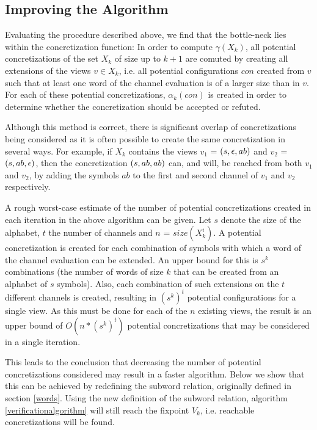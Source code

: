 \subsection{Improving the Algorithm}
Evaluating the procedure described above, we find that the bottle-neck lies within the concretization function:
 In order to compute $\gamma(X_k)$, all potential concretizations of the set $X_k$ of size up to $k+1$ are comuted by creating all extensions of the views $v \in X_k$, i.e. all potential configurations $con$ created from $v$ such that at least one word of the channel evaluation is of a larger size than in $v$. For each of these potential concretizations, $\alpha_k(con)$ is created in order to determine whether the concretization should be accepted or refuted.

Although this method is correct, there is significant overlap of concretizations being considered as it is often possible to create the same concretization  in several ways. For example, if $X_k$ contains the views $v_1$ = $(s, \epsilon, ab)$ and $v_2$ = $(s, ab, \epsilon)$, then the concretization $(s, ab,ab)$ can, and will, be reached from both $v_1$ and $v_2$, by adding the symbols $ab$ to the first and second channel of $v_1$ and $v_2$ respectively.

A rough worst-case estimate of the number of potential concretizations created in each iteration in the above algorithm can be given. Let $s$ denote the size of the alphabet, $t$ the number of channels and $n$ = $size(X_k^i)$. A potential concretization is created for each combination of symbols with which a word of the channel evaluation can be extended. An upper bound for this is $s^k$ combinations (the number of words of size $k$ that can be created from an alphabet of $s$ symbols). Also, each combination of such extensions on the $t$ different channels is created, resulting in $(s^k)^t$ potential configurations for a single view. As this must be done for each of the $n$ existing views, the result is an upper bound of $O(n*(s^k)^t)$ potential concretizations that may be considered in a single iteration.

This leads to the conclusion that decreasing the number of potential concretizations considered may result in a faster algorithm. Below we show that this can be achieved by redefining the subword relation, originally defined in section \ref{words}. Using the new definition of the subword relation, algorithm \ref{verificationalgorithm} will still reach the fixpoint $V_k$, i.e. reachable concretizations will be found.

